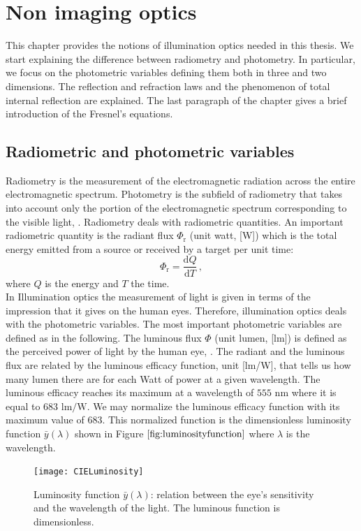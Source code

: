 \chapter{Non imaging optics}
This chapter provides the notions of illumination optics needed in this thesis. We start explaining the difference between radiometry and photometry.
In particular, we focus on the photometric variables defining them both in three and two dimensions. The reflection and refraction laws and the phenomenon of total internal reflection are explained. The last paragraph of the chapter gives a brief introduction of the Fresnel's equations. 
\section{Radiometric and photometric variables}
Radiometry is the measurement of the electromagnetic radiation across the entire electromagnetic spectrum. Photometry is the subfield of radiometry that takes into account only the portion of the electromagnetic spectrum corresponding to the visible light, \cite{zalewski1995radiometry}. Radiometry deals with radiometric quantities. An important radiometric quantity  is the radiant flux $\Phi_{\textrm{r}}$ (unit watt, [\textrm{W}]) which is the total energy emitted from a source or received by a target per unit time:
\begin{equation}
\Phi_{\textrm{r}} = \frac{\textrm{d}Q}{\textrm{d}T}\,,
\end{equation}
where $Q$ is the energy and $T$ the time.\\
\indent In Illumination optics the measurement of light is given in terms of the impression that it gives on the human eyes. Therefore, illumination optics deals with the photometric variables. The most important photometric variables are defined as in the following. The luminous flux $\Phi$ (unit lumen, [\textrm{lm}]) is defined as the perceived power of light by the human eye, \cite{chaves2015introduction}.
 The radiant and the luminous flux are related by the luminous efficacy function, unit [lm/W], that tells us how many lumen there are for each Watt of power at a given wavelength.
 The luminous efficacy reaches its maximum  at a wavelength of $555$ $\textrm{nm}$ where it is equal to $683$ $\textrm{lm}/\textrm{W}$.
  We may normalize the luminous efficacy function with its maximum value of $683$.
  This normalized function is the dimensionless luminosity function $\bar{y}(\lambda)$ shown in Figure $\ref{fig:luminosityfunction}$ where $\lambda$ is the wavelength.
\begin{figure}[h]
  \begin{center}
  \texttt{[image: CIELuminosity]}
  \end{center}
  \caption{Luminosity function $\bar{y}(\lambda)$: relation between the eye's sensitivity and the wavelength of the light. The luminous function is dimensionless.}
  \label{fig:luminosityfunction}
  \end{figure}
